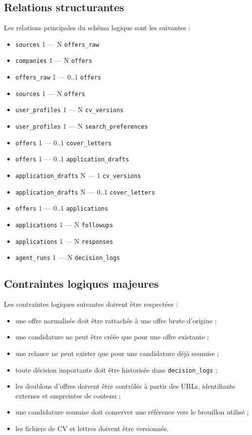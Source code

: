 \documentclass[11pt,a4paper]{article}
\begin{document}
\subsection{Relations structurantes}

Les relations principales du schéma logique sont les suivantes :

\begin{itemize}
    \item \texttt{sources} 1 --- N \texttt{offers\_raw}
    \item \texttt{companies} 1 --- N \texttt{offers}
    \item \texttt{offers\_raw} 1 --- 0..1 \texttt{offers}
    \item \texttt{sources} 1 --- N \texttt{offers}
    \item \texttt{user\_profiles} 1 --- N \texttt{cv\_versions}
    \item \texttt{user\_profiles} 1 --- N \texttt{search\_preferences}
    \item \texttt{offers} 1 --- 0..1 \texttt{cover\_letters}
    \item \texttt{offers} 1 --- 0..1 \texttt{application\_drafts}
    \item \texttt{application\_drafts} N --- 1 \texttt{cv\_versions}
    \item \texttt{application\_drafts} N --- 0..1 \texttt{cover\_letters}
    \item \texttt{offers} 1 --- 0..1 \texttt{applications}
    \item \texttt{applications} 1 --- N \texttt{followups}
    \item \texttt{applications} 1 --- N \texttt{responses}
    \item \texttt{agent\_runs} 1 --- N \texttt{decision\_logs}
\end{itemize}

\subsection{Contraintes logiques majeures}

Les contraintes logiques suivantes doivent être respectées :

\begin{itemize}
    \item une offre normalisée doit être rattachée à une offre brute d’origine ;
    \item une candidature ne peut être créée que pour une offre existante ;
    \item une relance ne peut exister que pour une candidature déjà soumise ;
    \item toute décision importante doit être historisée dans \texttt{decision\_logs} ;
    \item les doublons d’offres doivent être contrôlés à partir des URLs, identifiants externes et empreintes de contenu ;
    \item une candidature soumise doit conserver une référence vers le brouillon utilisé ;
    \item les fichiers de CV et lettres doivent être versionnés.
\end{itemize}
\end{document}
